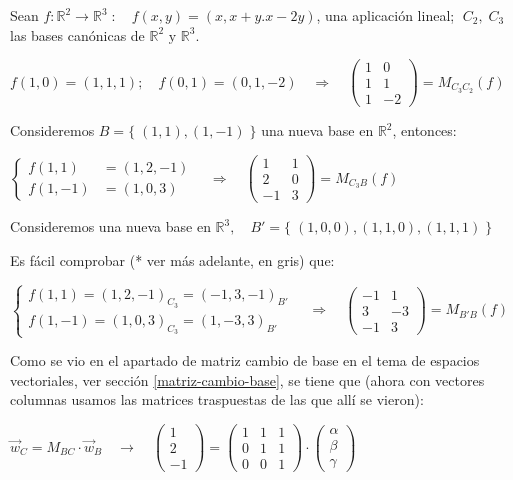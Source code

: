  \begin{ejem}
 	Sean $f:\mathbb R^2 \to \mathbb R^3\; : \quad f(x,y)=(x,x+y.x-2y)$, una aplicación lineal; $\; C_2,\; C_3$ las bases canónicas de $\mathbb R^2 \text{ y } \mathbb R^3$.
 	
 \noindent $f(1,0)=(1,1,1); \quad f(0,1)=(0,1,-2) \quad \Rightarrow \quad\left( \begin{matrix} 1&0\\1&1\\1&-2 \end{matrix} \right)=M_{C_3C_2}(f)$ 
 	
 \noindent Consideremos $B=\{\; (1,1),(1,-1) \;\}$ una nueva base en $\mathbb R^2$, entonces:
 
 \noindent $\begin{cases} f(1,1)&=(1,2,-1)\\f(1,-1)&=(1,0,3) \end{cases} \quad \Rightarrow \quad \left( \begin{matrix} 1&1\\2&0\\-1&3 \end{matrix} \right)=M_{C_3B}(f)$
 
 \noindent Consideremos una nueva base en $\mathbb R^3,\quad B'=\{\; (1,0,0), (1,1,0), (1,1,1) \;\}$
 
 \noindent Es fácil comprobar (* ver más adelante, en gris) que: 
 
 \noindent $\begin{cases} f(1,1)=(1,2,-1)_{C_3}=(-1,3,-1)_{B'}\\ f(1,-1)=(1,0,3)_{C_3}=(1,-3,3)_{B'} \end{cases} \quad \Rightarrow \quad \left( \begin{matrix} -1&1\\3&-3\\-1&3 \end{matrix} \right)=M_{B'B}(f)$
 
 \end{ejem}

\textcolor{gris}{Como se vio en el apartado de matriz cambio de base en el tema de espacios vectoriales, ver sección \ref{matriz-cambio-base}, se tiene que (ahora con vectores columnas usamos las matrices traspuestas de las que allí se vieron):}
 
 \textcolor{gris}{$\vec w_C = M_{BC}\cdot \vec w_B \quad \to \quad  \left( \begin{matrix} 1\\2\\-1 \end{matrix} \right)= \left( \begin{matrix} 1&1&1\\0&1&1\\0&0&1 \end{matrix} \right) \cdot \left( \begin{matrix} \alpha\\ \beta\\ \gamma \end{matrix}\right) $ }
 
